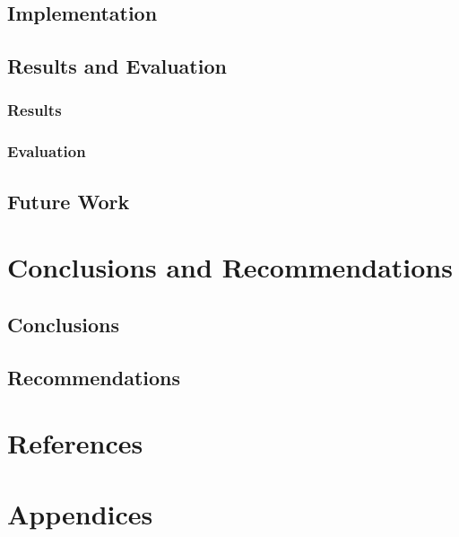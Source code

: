 \documentclass[12pt, a4paper]{report}
\begin{document}
\section{Implementation}

\section{Results and Evaluation}

\subsection{Results}

\subsection{Evaluation}

 \section{Future Work}

\newpage

 \chapter{Conclusions and Recommendations}

\section{Conclusions}

\newpage
\section{Recommendations}

\newpage

\chapter*{References}

\newpage

\chapter*{Appendices}

\end{document}
